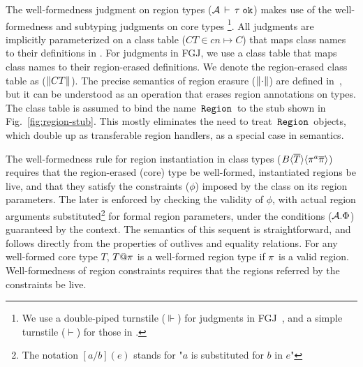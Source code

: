 \noindent The well-formedness judgment on region types
(${\mathcal{A}}\,\vdash\,\tau \; \texttt{ok}$) makes use of the well-formedness and subtyping
judgments on core types \footnote{We use a double-piped turnstile
($\Vdash$) for judgments in FGJ~\cite{fgj}, and a simple turnstile
($\vdash$) for those in \FB.}. All judgments are implicitly
parameterized on a class table ($CT \in cn \mapsto C$) that maps class
names to their definitions in \FB. For judgments in FGJ, we use a
class table that maps class names to their region-erased definitions.
We denote the region-erased class table as ($\left\| CT \right\|$). The precise
semantics of region erasure ($\left\| \cdot \right\|$) are defined
in~\cite{techrep}, but it can be understood as an operation that
erases region annotations on types. The class table is assumed to bind
the name $\,{\tt Region}\,$ to the stub shown in Fig.~\ref{fig:region-stub}.
This mostly eliminates the need to treat $\,{\tt Region}\,$ objects, which double
up as transferable region handlers, as a special case in semantics.

The well-formedness rule for region instantiation in class types
($B\langle \overline{T} \rangle\langle \pi^a\overline{\pi} \rangle$) requires that the region-erased
(core) type be well-formed, instantiated regions be live, and that
they satisfy the constraints ($\phi$) imposed by the class on its
region parameters. The later is enforced by checking the validity of
$\phi$, with actual region arguments substituted\footnote{The notation
$[a/b](e)$ stands for "$a$ is substituted for $b$ in $e$"} for formal
region parameters, under the conditions (${\mathcal{A}}.\Phi$) guaranteed by
the context. The semantics of this sequent is straightforward, and
follows directly from the properties of outlives and equality
relations. For any well-formed core type $T$, $T@\pi$ is a
well-formed region type if $\pi$ is a valid region. Well-formedness
of region constraints requires that the regions referred by the
constraints be live.

